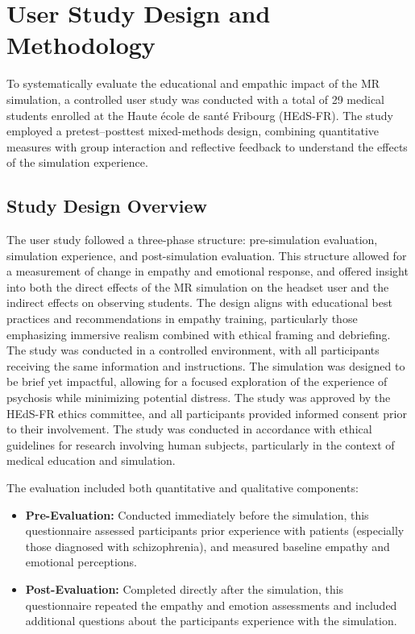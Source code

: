 \chapter{User Study Design and Methodology}
\label{ch:userstudy}


To systematically evaluate the educational and empathic impact of the MR simulation, a controlled user study was conducted with a total of 29 medical students enrolled at the Haute école de santé Fribourg (HEdS-FR). The study employed a pretest–posttest mixed-methods design, combining quantitative measures with group interaction and reflective feedback to understand the effects of the simulation experience.

\section{Study Design Overview}

The user study followed a three-phase structure: pre-simulation evaluation, simulation experience, and post-simulation evaluation. This structure allowed for a measurement of change in empathy and emotional response, and offered insight into both the direct effects of the MR simulation on the headset user and the indirect effects on observing students. The design aligns with educational best practices and recommendations in empathy training, particularly those emphasizing immersive realism combined with ethical framing and debriefing.
The study was conducted in a controlled environment, with all participants receiving the same information and instructions. The simulation was designed to be brief yet impactful, allowing for a focused exploration of the experience of psychosis while minimizing potential distress.
The study was approved by the HEdS-FR ethics committee, and all participants provided informed consent prior to their involvement. The study was conducted in accordance with ethical guidelines for research involving human subjects, particularly in the context of medical education and simulation.

The evaluation included both quantitative and qualitative components:

\begin{itemize}
  \item \textbf{Pre-Evaluation:} Conducted immediately before the simulation, this questionnaire assessed participants prior experience with patients (especially those diagnosed with schizophrenia), and measured baseline empathy and emotional perceptions.
  \item \textbf{Post-Evaluation:} Completed directly after the simulation, this questionnaire repeated the empathy and emotion assessments and included additional questions about the participants experience with the simulation.
\end{itemize}


